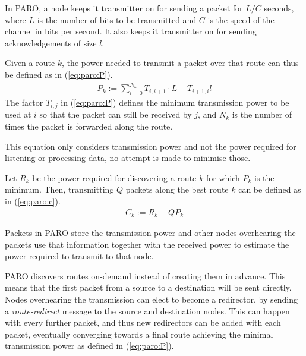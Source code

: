 In PARO, a node keeps it transmitter on for sending a packet for $L/C$ seconds,
where $L$ is the number of bits to be transmitted and $C$ is the speed of the
channel in bits per second.
It also keeps it transmitter on for sending acknowledgements of size $l$.

Given a route $k$, the power needed to transmit a packet over that
route can thus be defined as in (\ref{eq:paro:P}).
\begin{align}\label{eq:paro:P}
  P_{k} := \sum_{i=0}^{N_{k}} T_{i,i+1} \cdot L + T_{i+1,i} l
\end{align}
The factor $T_{i,j}$ in (\ref{eq:paro:P}) defines the minimum transmission power
to be used at $i$ so that the packet can still be received by $j$, and $N_{k}$
is the number of times the packet is forwarded along the route.

This equation only considers transmission power and not the power required for
listening or processing data, no attempt is made to minimise those.

Let $R_{k}$ be the power required for discovering a route $k$ for which $P_{k}$
is the minimum. Then, transmitting $Q$ packets along the best route $k$ can be
defined as in (\ref{eq:paro:c}).
\begin{align}\label{eq:paro:c}
  C_{k} := R_{k} + Q P_{k}
\end{align}


Packets in PARO store the transmission power and other nodes overhearing the
packets use that information together with the received power to estimate the
power required to transmit to that node.

PARO discovers routes on-demand instead of creating them in advance. This means
that the first packet from a source to a destination will be sent directly. Nodes
overhearing the transmission can elect to become a redirector, by sending a
\textit{route-redirect} message to the source and destination nodes. This can
happen with every further packet, and thus new redirectors can be added with
each packet, eventually converging towards a final route achieving the minimal
transmission power as defined in (\ref{eq:paro:P}).
